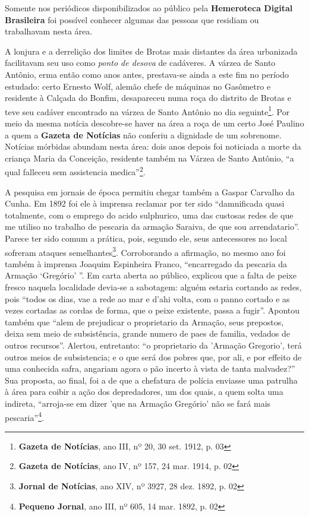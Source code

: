 
Somente nos periódicos disponibilizados ao público pela \textbf{Hemeroteca Digital Brasileira} foi possível conhecer algumas das pessoas que residiam ou trabalhavam nesta área.

A lonjura e a derrelição dos limites de Brotas mais distantes da área urbanizada facilitavam seu uso como \textit{ponto de desova} de cadáveres. A várzea de Santo Antônio, erma então como anos antes, prestava-se ainda a este fim no período estudado: certo Ernesto Wolf, alemão chefe de máquinas no Gasômetro e residente à Calçada do Bonfim, desapareceu numa roça do distrito de Brotas e teve seu cadáver encontrado na várzea de Santo Antônio no dia seguinte\footnote{\textbf{Gazeta de Notícias}, ano III, nº 20, 30 set. 1912, p. 03}. Por meio da mesma notícia descobre-se haver na área a roça de um certo José Paulino a quem a \textbf{Gazeta de Notícias} não conferiu a dignidade de um sobrenome. Notícias mórbidas abundam nesta área: dois anos depois foi noticiada a morte da criança Maria da Conceição, residente também na Várzea de Santo Antônio, ``a qual falleceu sem assistencia medica''\footnote{\textbf{Gazeta de Notícias}, ano IV, nº 157, 24 mar. 1914, p. 02}.

A pesquisa em jornais de época permitiu chegar também a Gaspar Carvalho da Cunha. Em 1892 foi ele à imprensa reclamar por ter sido ``damnificada quasi totalmente, com o emprego do acido sulphurico, uma das custosas redes de que me utiliso no trabalho de pescaria da armação Saraiva, de que sou arrendatario''. Parece ter sido comum a prática, pois, segundo ele, seus antecessores no local sofreram ataques semelhantes\footnote{\textbf{Jornal de Notícias}, ano XIV, nº 3927, 28 dez. 1892, p. 02}. Corroborando a afirmação, no mesmo ano foi também à imprensa Joaquim Espinheira Franco, ``encarregado da pescaria da Armação `Gregório' ''. Em carta aberta ao público, explicou que a falta de peixe fresco naquela localidade devia-se a sabotagem: alguém estaria cortando as redes, pois ``todos os dias, vae a rede ao mar e d'ahi volta, com o panno cortado e as vezes cortadas as cordas de forma, que o peixe existente, passa a fugir''. Apontou também que ``alem de prejudicar o proprietario da Armação, seus prepostos, deixa sem meio de subsistência, grande numero de paes de familia, vedados de outros recursos''. Alertou, entretanto: ``o proprietario da 'Armação Gregorio', terá outros meios de subsistencia; e o que será dos pobres que, por ali, e por effeito de uma conhecida safra, angariam agora o pão incerto à vista de tanta malvadez?'' Sua proposta, ao final, foi a de que a chefatura de polícia enviasse uma patrulha à área para coibir a ação dos depredadores, um dos quais, a quem solta uma indireta, ``arroja-se em dizer 'que na Armação Gregório' não se fará mais pescaria''\footnote{\textbf{Pequeno Jornal}, ano III, nº 605, 14 mar. 1892, p. 02}.



